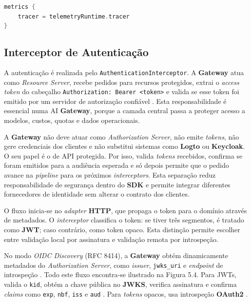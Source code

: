     \vspace{0.5em}
    \begin{lstlisting}[language=kotlin, caption={Instalação do \textit{interceptor} de \textit{tracing} via configuração de métricas}]
metrics {
    tracer = telemetryRuntime.tracer
}
    \end{lstlisting}

    \subsection{Interceptor de Autenticação}
    A autenticação é realizada pelo \texttt{AuthenticationInterceptor}. A \textbf{Gateway} atua como \textit{Resource Server}, recebe pedidos para recursos protegidos, extrai o \textit{access token} do cabeçalho \texttt{Authorization: Bearer <token>} e valida se esse token foi emitido por um servidor de autorização confiável \cite{rfc6749,rfc6750,oauth_resource_server}. Esta responsabilidade é essencial numa AI \textbf{Gateway}, porque a camada central passa a proteger acesso a modelos, custos, quotas e dados operacionais.

    A \textbf{Gateway} não deve atuar como \textit{Authorization Server}, não emite \textit{tokens}, não gere credenciais dos clientes e não substitui sistemas como \textbf{Logto} ou \textbf{Keycloak}. O seu papel é o de API protegida. Por isso, valida \textit{tokens} recebidos, confirma se foram emitidos para a audiência esperada e só depois permite que o pedido avance na \textit{pipeline} para os próximos \textit{interceptors}. Esta separação reduz responsabilidade de segurança dentro do \textbf{SDK} e permite integrar diferentes fornecedores de identidade sem alterar o contrato dos clientes.

    O fluxo inicia-se no \textit{adapter} \textbf{HTTP}, que propaga o token para o domínio através de metadados. O \textit{interceptor} classifica o token: se tiver três segmentos, é tratado como \textbf{JWT}; caso contrário, como token opaco. Esta distinção permite escolher entre validação local por assinatura e validação remota por introspeção.

    No modo \textit{OIDC Discovery} (RFC 8414)\cite{ref_oidc}, a \textbf{Gateway} obtém dinamicamente metadados do \textit{Authorization Server}, como \textit{issuer}, \texttt{jwks\_uri} e \textit{endpoint} de introspeção \cite{rfc8414}. Todo este fluxo encontra-se ilustrado na Figura 5.4. Para JWTs, valida o \texttt{kid}, obtém a chave pública no \textbf{JWKS}, verifica assinatura e confirma \textit{claims} como \texttt{exp}, \texttt{nbf}, \texttt{iss} e \texttt{aud} \cite{rfc7519,rfc7517,rfc7515}. Para \textit{tokens} opacos, usa introspeção \textbf{OAuth2} \cite{rfc7662}.


